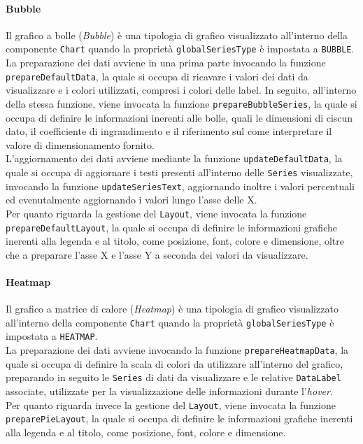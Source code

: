 \paragraph{Bubble}
Il grafico a bolle (\textit{Bubble}) è una tipologia di grafico visualizzato all'interno della componente \texttt{Chart} quando la proprietà \texttt{globalSeriesType} è impostata a \texttt{BUBBLE}. \\
La preparazione dei dati avviene in una prima parte invocando la funzione \texttt{prepareDefaultData}, la quale si occupa di ricavare i valori dei dati da visualizzare e i colori utilizzati, compresi i
colori delle label. In seguito, all'interno della stessa funzione, viene invocata la funzione \texttt{prepareBubbleSeries}, la quale si occupa di definire le informazioni inerenti alle bolle, quali le
dimensioni di ciscun dato, il coefficiente di ingrandimento e il riferimento sul come interpretare il valore di dimensionamento fornito. \\
L'aggiornamento dei dati avviene mediante la funzione \texttt{updateDefaultData}, la quale si occupa di aggiornare i testi presenti all'interno delle \texttt{Series} visualizzate, invocando la funzione
\texttt{updateSeriesText}, aggiornando inoltre i valori percentuali ed evenutalmente aggiornando i valori lungo l'asse delle X. \\
Per quanto riguarda la gestione del \texttt{Layout}, viene invocata la funzione \texttt{prepareDefaultLayout}, la quale si occupa di definire le informazioni grafiche inerenti alla legenda e al titolo, come posizione,
font, colore e dimensione, oltre che a preparare l'asse X e l'asse Y a seconda dei valori da visualizzare.

\paragraph{Heatmap}
Il grafico a matrice di calore (\textit{Heatmap}) è una tipologia di grafico visualizzato all'interno della componente \texttt{Chart} quando la proprietà \texttt{globalSeriesType} è impostata a \texttt{HEATMAP}. \\
La preparazione dei dati avviene invocando la funzione \texttt{prepareHeatmapData}, la quale si occupa di definire la scala di colori da utilizzare all'interno del grafico, preparando in seguito le \texttt{Series}
di dati da visualizzare e le relative \texttt{DataLabel} associate, utilizzate per la visualizzazione delle informazioni durante l'\textit{hover}. \\
Per quanto riguarda invece la gestione del \texttt{Layout}, viene invocata la funzione \texttt{preparePieLayout}, la quale si occupa di definire le informazioni grafiche inerenti alla legenda e al titolo,
come posizione, font, colore e dimensione.

